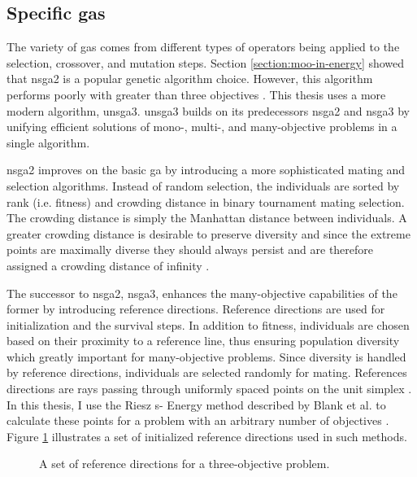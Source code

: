 \subsection{Specific \Aclp{ga}} The variety of \acp{ga} comes from different
types of operators being applied to the selection, crossover, and mutation
steps. Section \ref{section:moo-in-energy} showed that \ac{nsga2} is a popular
genetic algorithm choice. However, this algorithm performs poorly with greater
than three objectives \cite{deb_fast_2002, seada_unified_2016}. This thesis
uses a more modern algorithm, \ac{unsga3}. \ac{unsga3} builds on its
predecessors \ac{nsga2} and \ac{nsga3} by unifying efficient solutions of mono-,
multi-, and many-objective problems in a single algorithm.


\ac{nsga2} improves on the basic \ac{ga} by introducing a more sophisticated
mating and selection algorithms. Instead of random selection, the individuals
are sorted by rank (i.e. fitness) and crowding distance in binary tournament
mating selection. The crowding distance is simply the Manhattan distance between
individuals. A greater crowding distance is desirable to preserve diversity and
since the extreme points are maximally diverse they should always persist and
are therefore assigned a crowding distance of infinity \cite{deb_fast_2002}.

The successor to \ac{nsga2}, \ac{nsga3}, enhances the many-objective
capabilities of the former by introducing reference directions. Reference
directions are used for initialization and the survival steps. In addition to
fitness, individuals are chosen based on their proximity to a reference line,
thus ensuring population diversity which greatly important for many-objective
problems. Since diversity is handled by reference directions, individuals are
selected randomly for mating. References directions are rays passing through
uniformly spaced points on the unit simplex \cite{seada_unified_2016,
blank_generating_2021}. In this thesis, I use the Riesz s- Energy method
described by Blank et al. to calculate these points for a problem with an
arbitrary number of objectives \cite{blank_generating_2021}. Figure
\ref{fig:ref-dirs} illustrates a set of initialized reference directions used
in such methods.

\begin{figure}[h]
  \centering
  \resizebox{0.6\columnwidth}{!}{}
  \caption{A set of reference directions for a three-objective problem.}
  \label{fig:ref-dirs}
\end{figure}

